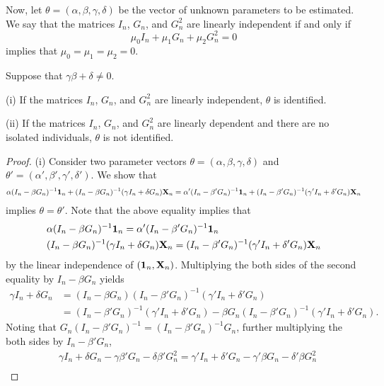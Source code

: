 \documentclass[11pt, A4paper, openany, uplatex]{book}
\begin{document}
Now, let $\theta = (\alpha, \beta, \gamma, \delta)$ be the vector of unknown parameters to be estimated.
We say that the matrices $I_n$, $G_n$, and $G_n^2$ are linearly independent if and only if
\[
	\mu_0 I_n + \mu_1 G_n + \mu_2 G_n^2 = 0
\]
implies that $\mu_0 = \mu_1 = \mu_2 = 0$.
\begin{proposition}\label{prop:bra}
	Suppose that $\gamma \beta + \delta \neq 0$.
	
	(i)  If the matrices $I_n$, $G_n$, and $G_n^2$ are linearly independent, $\theta$  is identified.
	
	(ii) If the matrices $I_n$, $G_n$, and $G_n^2$ are linearly dependent and there are no isolated individuals, $\theta$ is not identified.
\end{proposition}

\begin{proof}
	(i) Consider two parameter vectors $\theta = (\alpha, \beta, \gamma, \delta)$ and $\theta' = (\alpha', \beta', \gamma', \delta')$.
	We show that
	\begin{align}\label{eq:ident1}
	\alpha (I_n - \beta G_n)^{-1}\mathbf{1}_n  + (I_n - \beta G_n)^{-1}( \gamma I_n + \delta G_n ) \mathbf{X}_n = \alpha' (I_n - \beta' G_n)^{-1}\mathbf{1}_n  + (I_n - \beta' G_n)^{-1}( \gamma' I_n + \delta' G_n ) \mathbf{X}_n
	\end{align}
	implies $\theta = \theta'$.
	Note that the above equality implies that 
	\begin{align*}
	& \alpha (I_n - \beta G_n)^{-1}\mathbf{1}_n = \alpha' (I_n - \beta' G_n)^{-1}\mathbf{1}_n\\
	& (I_n - \beta G_n)^{-1}( \gamma I_n + \delta G_n ) \mathbf{X}_n = (I_n - \beta' G_n)^{-1}( \gamma' I_n + \delta' G_n ) \mathbf{X}_n
	\end{align*}
	by the linear independence of $(\mathbf{1}_n, \mathbf{X}_n)$.
	Multiplying the both sides of the second equality by $I_n - \beta G_n$ yields
	\begin{align*}
	\gamma I_n + \delta G_n 
	& = (I_n - \beta G_n) (I_n - \beta' G_n)^{-1}( \gamma' I_n + \delta' G_n ) \\
	& = (I_n - \beta' G_n)^{-1}( \gamma' I_n + \delta' G_n )  - \beta G_n(I_n - \beta' G_n)^{-1}( \gamma' I_n + \delta' G_n ).
	\end{align*}
	Noting that $G_n(I_n - \beta' G_n)^{-1} = (I_n - \beta' G_n)^{-1} G_n$, further multiplying the both sides by $I_n - \beta' G_n$,
	\begin{align}
	& \gamma I_n + \delta G_n - \gamma \beta' G_n - \delta \beta' G_n^2 =  \gamma' I_n + \delta' G_n   - \gamma' \beta G_n   - \delta' \beta G_n^2 \nonumber \\

\end{align}
\end{proof}
\end{document}
